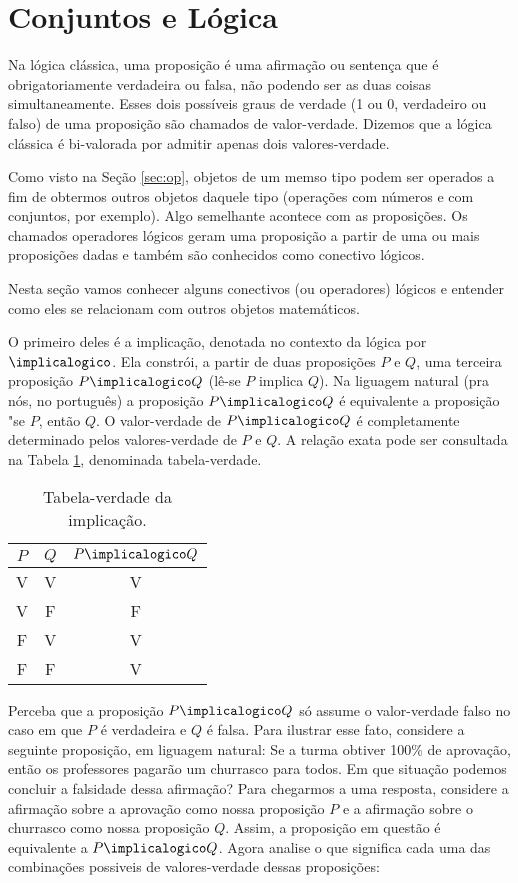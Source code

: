 \section{Conjuntos e Lógica}

Na lógica clássica, uma proposição é uma afirmação ou sentença que é obrigatoriamente verdadeira ou falsa, não podendo ser as duas coisas simultaneamente. Esses dois possíveis graus de verdade (1 ou 0, verdadeiro ou falso) de uma proposição são chamados de valor-verdade. Dizemos que a lógica clássica é bi-valorada por admitir apenas dois valores-verdade. 

Como visto na Seção \ref{sec:op}, objetos de um memso tipo podem ser operados a  fim de obtermos outros objetos daquele tipo (operações com números e com conjuntos, por exemplo). Algo semelhante acontece com as proposições. Os chamados operadores lógicos geram uma proposição a partir de uma ou mais proposições dadas e também são conhecidos como conectivo lógicos.
 
Nesta seção vamos conhecer alguns conectivos (ou operadores) lógicos e entender como eles se relacionam com outros objetos matemáticos.

O primeiro deles é a implicação, denotada no contexto da lógica por $\implicalogico$.  Ela constrói, a partir de duas proposições $P$ e $Q$, uma terceira proposição $P \implicalogico Q$ (lê-se $P$ implica $Q$). Na liguagem natural (pra nós, no português) a proposição $P\implicalogico Q$ é equivalente a proposição "se $P$, então $Q$. O valor-verdade de $P \implicalogico Q$ é completamente determinado pelos valores-verdade de $P$ e $Q$. A relação exata pode ser consultada na Tabela \ref{tbl:implicacao}, denominada tabela-verdade.

\begin{table}[h]
	\centering
	\begin{tabular}{cc|c}
		$P$		& $Q$		& $P \implicalogico Q$ \\ \hline
		V		& V			& V			           \\
		V		& F			& F			           \\
		F		& V			& V			           \\
		F		& F			& V			           \\	
	\end{tabular}
	\caption{Tabela-verdade da implicação.}
	\label{tbl:implicacao}
\end{table}

Perceba que a proposição $P\implicalogico Q$ só assume o valor-verdade falso no caso em que $P$ é verdadeira e $Q$ é falsa. Para ilustrar esse fato, considere a seguinte proposição, em liguagem natural: Se a turma obtiver 100\% de aprovação, então os professores pagarão um churrasco para todos. Em que situação podemos concluir a falsidade dessa afirmação? 
Para chegarmos a uma resposta, considere a afirmação sobre a aprovação como nossa proposição $P$ e a afirmação sobre o churrasco como nossa proposição $Q$. Assim, a proposição em questão é equivalente a $P\implicalogico Q$. 
Agora analise o que significa cada uma das combinações possiveis de valores-verdade dessas proposições:


